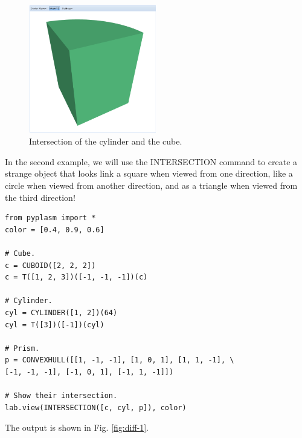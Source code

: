 \documentclass[article,A4,12pt]{llncs}
\begin{document}
\newpage

\begin{figure}[!ht]
\begin{center}
\includegraphics[width=0.5\textwidth]{img/int-2.png}
\end{center}
\vspace{-2mm}
\caption{Intersection of the cylinder and the cube.}
\label{fig:int-2}
\end{figure}
\noindent
In the second example, we will use the INTERSECTION command to create 
a strange object that looks link a square when viewed
from one direction, like a circle when viewed from another direction, 
and as a triangle when viewed from the third direction!


\begin{verbatim}
from pyplasm import *
color = [0.4, 0.9, 0.6]

# Cube.
c = CUBOID([2, 2, 2])
c = T([1, 2, 3])([-1, -1, -1])(c)

# Cylinder.
cyl = CYLINDER([1, 2])(64)
cyl = T([3])([-1])(cyl)

# Prism.
p = CONVEXHULL([[1, -1, -1], [1, 0, 1], [1, 1, -1], \
[-1, -1, -1], [-1, 0, 1], [-1, 1, -1]])

# Show their intersection.
lab.view(INTERSECTION([c, cyl, p]), color)
\end{verbatim}
The output is shown in Fig. \ref{fig:diff-1}.
\end{document}
